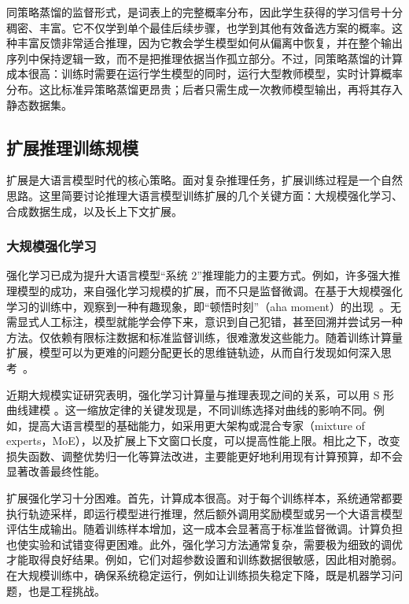 同策略蒸馏的监督形式，是词表上的完整概率分布，因此学生获得的学习信号十分稠密、丰富。它不仅学到单个最佳后续步骤，也学到其他有效备选方案的概率。这种丰富反馈非常适合推理，因为它教会学生模型如何从偏离中恢复，并在整个输出序列中保持逻辑一致，而不是把推理依据当作孤立部分。不过，同策略蒸馏的计算成本很高：训练时需要在运行学生模型的同时，运行大型教师模型，实时计算概率分布。这比标准异策略蒸馏更昂贵；后者只需生成一次教师模型输出，再将其存入静态数据集。

\subsection{扩展推理训练规模}

扩展是大语言模型时代的核心策略。面对复杂推理任务，扩展训练过程是一个自然思路。这里简要讨论推理大语言模型训练扩展的几个关键方面：大规模强化学习、合成数据生成，以及长上下文扩展。

\subsubsection{大规模强化学习}

强化学习已成为提升大语言模型“系统 2”推理能力的主要方式。例如，许多强大推理模型的成功，来自强化学习规模的扩展，而不只是监督微调。在基于大规模强化学习的训练中，观察到一种有趣现象，即“顿悟时刻”（aha moment）的出现~\cite{deepseek:2025r1}。无需显式人工标注，模型就能学会停下来，意识到自己犯错，甚至回溯并尝试另一种方法。仅依赖有限标注数据和标准监督训练，很难激发这些能力。随着训练计算量扩展，模型可以为更难的问题分配更长的思维链轨迹，从而自行发现如何深入思考~\cite{snell-etal:2024scaling}。

近期大规模实证研究表明，强化学习计算量与推理表现之间的关系，可以用 S 形曲线建模 \cite{khatri-etal:2025art,tan-etal:2026scaling}。这一缩放定律的关键发现是，不同训练选择对曲线的影响不同。例如，提高大语言模型的基础能力，如采用更大架构或混合专家（mixture of experts，MoE），以及扩展上下文窗口长度，可以提高性能上限。相比之下，改变损失函数、调整优势归一化等算法改进，主要能更好地利用现有计算预算，却不会显著改善最终性能。

扩展强化学习十分困难。首先，计算成本很高。对于每个训练样本，系统通常都要执行轨迹采样，即运行模型进行推理，然后额外调用奖励模型或另一个大语言模型评估生成输出。随着训练样本增加，这一成本会显著高于标准监督微调。计算负担也使实验和试错变得更困难。此外，强化学习方法通常复杂，需要极为细致的调优才能取得良好结果。例如，它们对超参数设置和训练数据很敏感，因此相对脆弱。在大规模训练中，确保系统稳定运行，例如让训练损失稳定下降，既是机器学习问题，也是工程挑战。

